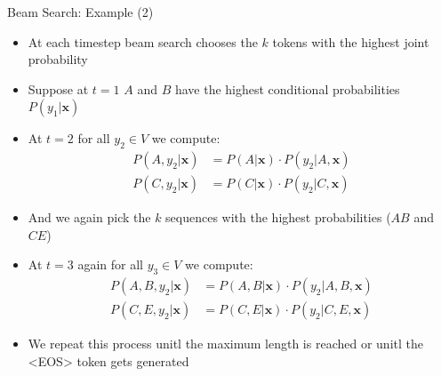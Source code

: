 \begin{vbframe}{Beam Search: Example (2)}

\vfill

\begin{itemize}
    \item At each timestep beam search chooses the $k$ tokens with the highest joint probability
    \item Suppose at $t=1$ $A$ and $B$ have the highest conditional probabilities $P(y_1|\mathbf{x})$
    \item At $t=2$ for all $y_2\in V$ we compute:
    $$
    \begin{aligned}
    P(A,y_2|\mathbf{x}) &= P(A|\mathbf{x})\cdot P(y_2|A,\mathbf{x}) \\
    P(C,y_2|\mathbf{x}) &= P(C|\mathbf{x})\cdot P(y_2|C,\mathbf{x})
    \end{aligned}
    $$
    \item And we again pick the $k$ sequences with the highest probabilities ($AB$ and $CE$)
    \item At $t=3$ again for all $y_3\in V$ we compute:
    $$
    \begin{aligned}
    P(A,B,y_2|\mathbf{x}) &= P(A,B|\mathbf{x})\cdot P(y_2|A,B,\mathbf{x}) \\
    P(C,E,y_2|\mathbf{x}) &= P(C,E|\mathbf{x})\cdot P(y_2|C,E,\mathbf{x})
    \end{aligned}
    $$
    \item We repeat this process unitl the maximum length is reached or unitl the <EOS> token gets generated
\end{itemize}

\vfill
    
\end{vbframe}

